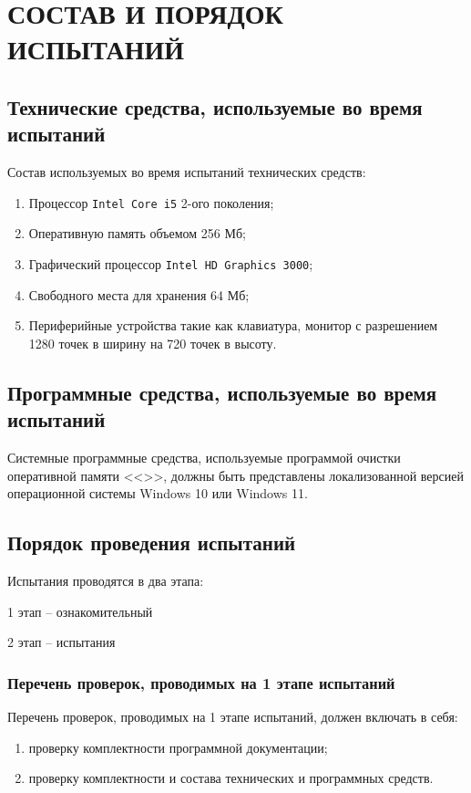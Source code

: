 \documentclass[14pt,a4paper,final]{extreport}
\begin{document}
\chapter{СОСТАВ И ПОРЯДОК ИСПЫТАНИЙ}
\section{Технические средства, используемые во время испытаний}
Состав используемых во время испытаний технических средств:
\begin{enumerate}[label=\asbuk*),ref=\asbuk*]
	\item Процессор \texttt{Intel Core i5} 2-ого поколения;
	\item Оперативную память объемом 256 Мб;
	\item Графический процессор \texttt{Intel HD Graphics 3000};
	\item Свободного места для хранения 64 Мб;
	\item Периферийные устройства такие как клавиатура, монитор с разрешением 1280 точек в ширину на 720 точек в высоту.
\end{enumerate}

\section{Программные средства, используемые во время испытаний}
Системные программные средства, используемые программой очистки оперативной памяти <<\programtitle>>, должны быть представлены локализованной версией операционной системы Windows 10 или Windows 11.

\section{Порядок проведения испытаний}
Испытания проводятся в два этапа:

1 этап -- ознакомительный

2 этап -- испытания

\subsection{Перечень проверок, проводимых на 1 этапе испытаний}
Перечень проверок, проводимых на 1 этапе испытаний, должен включать в себя:

\begin{enumerate}
	\item[а)] проверку комплектности программной документации;
	\item[б)] проверку комплектности и состава технических и программных средств.
\end{enumerate}
\end{document}
